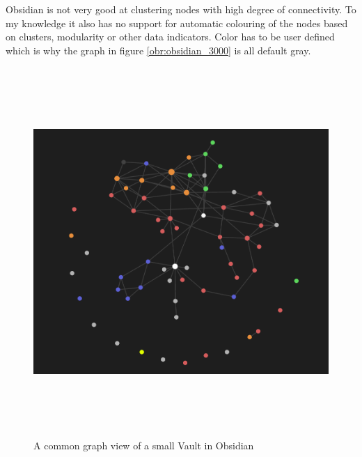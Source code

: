 Obsidian is not very good at clustering nodes with high degree of connectivity.
To my knowledge it also has no support for automatic colouring of the nodes based on clusters, modularity  or other data indicators.
Color has to be user defined which is why the graph in figure \ref{obr:obsidian_3000} is all default gray.

\begin{figure}[p]\centering
  \includegraphics[width=140mm, height=140mm]{img/obsidian_common_notes.png}
  \caption{A common graph view of a small Vault in Obsidian}
  \label{obr:obsidian_common}
\end{figure}


